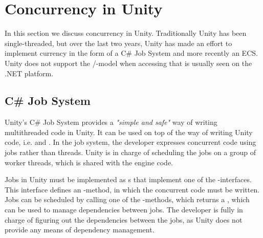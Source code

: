 \section{Concurrency in Unity} \label{sec:unity:concurrency}
In this section we discuss concurrency in Unity. 
Traditionally Unity has been single-threaded, but over the last two years, Unity has made an effort to implement currency in the form of a C\# Job System\cite{unity:csharp:job:system} and more recently an \gls{ECS}\cite{unity:ecs}. Unity does not support the /-model when accessing  that is usually seen on the .NET platform\cite{unity:async,csharp:async}.

\subsection{C\# Job System}
Unity's C\# Job System provides a \textit{"simple and safe"} way of writing multithreaded code in Unity. It can be used on top of the  way of writing Unity code, i.e.  and . In the job system, the developer expresses concurrent code using jobs rather than threads. Unity is in charge of scheduling the jobs on a group of worker threads, which is shared with the engine code\cite{unity:csharp:job:system}.

Jobs in Unity must be implemented as s that implement one of the -interfaces. This interface defines an -method, in which the concurrent code must be written. Jobs can be scheduled by calling one of the -methods, which returns a , which can be used to manage dependencies between jobs. The developer is fully in charge of figuring out the dependencies between the jobs, as Unity does not provide any means of dependency management\cite{unity:csharp:job:system}.

